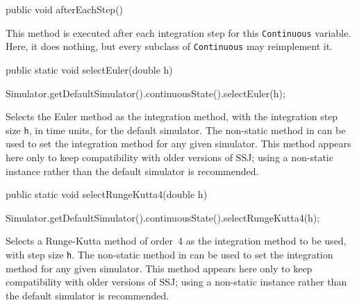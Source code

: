 \begin{htmlonly}
\end{htmlonly}
\begin{code}

   public void afterEachStep() \begin{hide} {
   } \end{hide}
\end{code}
  \begin{tabb}  This method is executed after each integration step
   for this \texttt{Continuous} variable.
   Here, it does nothing, but every subclass of \texttt{Continuous} may
   reimplement it.
  \end{tabb}
\begin{code}

   public static void selectEuler(double h) \begin{hide} {
      Simulator.getDefaultSimulator().continuousState().selectEuler(h);
   } \end{hide}
\end{code}
  \begin{tabb}  Selects the Euler method as the integration method,
  with the integration step size \texttt{h}, in time units, for the default simulator.
  The non-static method  in 
  can be used to set the integration method for any given simulator.
  This method appears here only to keep compatibility with older versions of SSJ; using
  a non-static  instance rather than the default simulator is recommended.
  \end{tabb}
\begin{htmlonly}
\end{htmlonly}
\begin{code}

   public static void selectRungeKutta4(double h) \begin{hide} {
      Simulator.getDefaultSimulator().continuousState().selectRungeKutta4(h);
   } \end{hide}
\end{code}
  \begin{tabb}  Selects a Runge-Kutta method of order~4 as the integration
  method to be used, with step size \texttt{h}.
  The non-static method  in 
  can be used to set the integration method for any given simulator.
  This method appears here only to keep compatibility with older versions of SSJ; using
  a non-static  instance rather than the default simulator is recommended.
  \end{tabb}
